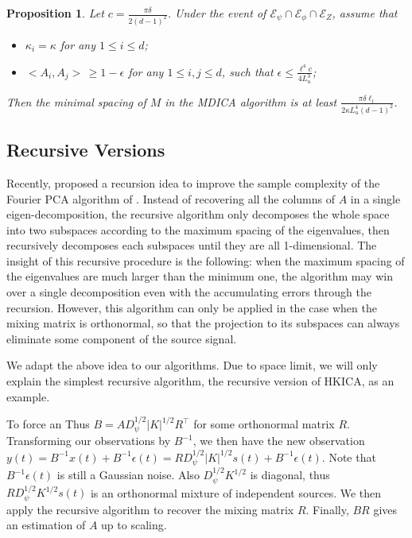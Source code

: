 \documentclass[jmlr]{article}
\newcommand{\Epsi}{\mathcal{E}_{\psi}}
\newcommand{\Ephi}{\mathcal{E}_{\phi}}
\newcommand{\EZ}{\mathcal{E}_{Z}}
\newtheorem{prop}[lemma]{Proposition}
\theoremstyle{definition}
\newcommand{\eps}{\epsilon}
\begin{document}
\begin{prop}
\label{prop:spacingMDICA}
Let $c = \frac{\pi\delta}{2(d-1)^2}$. Under the event of $\Epsi\cap\Ephi\cap \EZ$, assume that
\begin{itemize}
\item $\kappa_i = \kappa$ for any $1\le i\le d$;
\item $<A_i, A_j> \,\ge 1-\eps$ for any $1\le i, j \le d$, such that $\eps \le \frac{\ell^4 c}{4L_u^3}$;
\end{itemize}
Then the minimal spacing of $M$  in the MDICA algorithm is at least $\frac{\pi\delta\ell_l}{2\kappa L_u^4 (d-1)^2}$. 
\end{prop}

\subsection{Recursive Versions}
Recently, \citet{vempala2014max} proposed a recursion idea to improve the sample complexity of the Fourier PCA algorithm of \citet{goyal2014fourier}. 
Instead of recovering all the columns of $A$ in a single eigen-decomposition, the recursive algorithm only decomposes the whole space into two subspaces according to the maximum spacing of the eigenvalues, 
then recursively decomposes each subspaces until they are all 1-dimensional.
The insight of this recursive procedure is the following: when the maximum spacing of the eigenvalues are much larger than the minimum one, the algorithm may win over a single decomposition even with the accumulating errors through the recursion.
However, this algorithm can only be applied in the case when the mixing matrix is orthonormal, so that the projection to its subspaces can always eliminate some component of the source signal. 

We adapt the above idea to our algorithms. Due to space limit, we will only explain the simplest recursive algorithm, the recursive version of HKICA, as an example.

To force an%
Thus $B = AD_{\psi}^{1/2}|K|^{1/2}R^{\top}$ for some orthonormal matrix $R$. 
Transforming our observations by $B^{-1}$, we then have the new observation $y(t) = B^{-1}x(t) + B^{-1}\eps(t) = RD_{\psi}^{1/2}|K|^{1/2}s(t) + B^{-1}\eps(t)$. 
Note that $B^{-1}\eps(t)$ is still a Gaussian noise. Also $D_{\psi}^{1/2}K^{1/2}$ is diagonal, thus $RD_{\psi}^{1/2}K^{1/2}s(t)$ is an orthonormal mixture of independent sources.
We then apply the recursive algorithm to recover the mixing matrix $R$. Finally, $BR$ gives an estimation of $A$ up to scaling.
\end{document}
